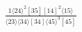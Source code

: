 \documentclass[varwidth, border=5pt]{standalone}
\begin{document}
\begin{my}
$\begin{gathered}
\scriptscriptstyle\frac{1⟨24⟩^2[35][14]^2⟨15⟩}{⟨23⟩⟨34⟩[34]⟨45⟩^3[45]}
\end{gathered}$
\end{my}
\end{document}
